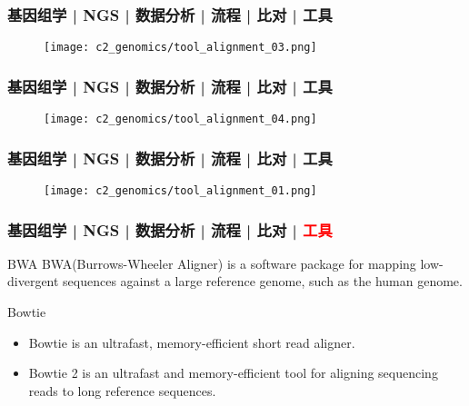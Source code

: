 \begin{frame}
  \frametitle{基因组学 | NGS | 数据分析 | 流程 | 比对 | 工具}
  \begin{figure}
    \centering
    \texttt{[image: c2\_genomics/tool\_alignment\_03.png]}
  \end{figure}
\end{frame}

\begin{frame}
  \frametitle{基因组学 | NGS | 数据分析 | 流程 | 比对 | 工具}
  \begin{figure}
    \centering
    \texttt{[image: c2\_genomics/tool\_alignment\_04.png]}
  \end{figure}
\end{frame}

\begin{frame}
  \frametitle{基因组学 | NGS | 数据分析 | 流程 | 比对 | 工具}
  \begin{figure}
    \centering
    \texttt{[image: c2\_genomics/tool\_alignment\_01.png]}
  \end{figure}
\end{frame}

\begin{frame}
  \frametitle{基因组学 | NGS | 数据分析 | 流程 | 比对 | \textcolor{red}{工具}}
  \begin{block}{BWA}
    BWA(Burrows-Wheeler Aligner) is a software package for mapping low-divergent sequences against a large reference genome, such as the human genome.
  \end{block}
  \pause
  \begin{block}{Bowtie}
    \begin{itemize}
      \item Bowtie is an ultrafast, memory-efficient short read aligner.
      \item Bowtie 2 is an ultrafast and memory-efficient tool for aligning sequencing reads to long reference sequences.
    \end{itemize}
  \end{block}
\end{frame}


